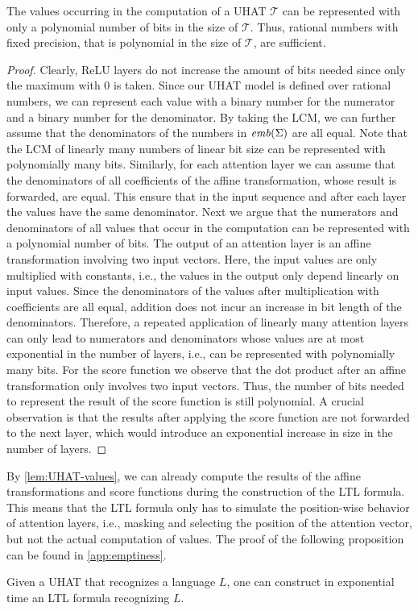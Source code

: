 \begin{proposition}\label{lem:UHAT-values}
The values occurring in the computation of a UHAT $\mathcal{T}$ 
can be represented with only a polynomial number of bits in the size of $\mathcal{T}$.
Thus, rational numbers with fixed precision, that is polynomial in the size of $\mathcal{T}$, are sufficient.
\end{proposition}
\begin{proof}
Clearly, ReLU layers do not increase the amount of bits needed since only the maximum with 0 is taken.
Since our UHAT model is defined over rational numbers, 
we can represent each value with a binary number for the numerator and a binary number for the denominator. 
By taking the LCM, we can further assume that the denominators of the numbers in $\mathit{emb}(\Sigma)$ are all equal.
Note that the LCM of linearly many numbers of linear bit size can be represented with polynomially many bits.
Similarly, for each attention layer we can assume that the denominators of all coefficients of the affine transformation,
whose result is forwarded, are equal.
This ensure that in the input sequence and after each layer the values have the same denominator.
Next we argue that the numerators and denominators of all values that occur in the computation
can be represented with a polynomial number of bits.
The output of an attention layer is an affine transformation involving two input vectors.
Here, the input values are only multiplied with constants, i.e., the values in the output only depend linearly on input values.
Since the denominators of the values after multiplication with coefficients are all equal,
addition does not incur an increase in bit length of the denominators.
Therefore, a repeated application of linearly many attention layers can only lead to numerators and denominators
whose values are at most exponential in the number of layers, i.e., can be represented with polynomially many bits. 
For the score function we observe that the dot product after an affine transformation only involves two input vectors.
Thus, the number of bits needed to represent the result of the score function is still polynomial.
A crucial observation is that the results after applying the score function are not forwarded to the next layer,
which would introduce an exponential increase in size in the number of layers.
\end{proof}

By \cref{lem:UHAT-values}, we can already compute the results of the affine transformations and score functions 
during the construction of the LTL formula.
This means that the LTL formula only has to simulate the position-wise behavior of attention layers, i.e.,
masking and selecting the position of the attention vector,
but not the actual computation of values.
The proof of the following proposition can be found in \cref{app:emptiness}.
\begin{proposition}\label{prop:UHAT-LTL}
Given a UHAT that recognizes a language $L$, one can construct in exponential time an LTL formula recognizing $L$.
\end{proposition}


